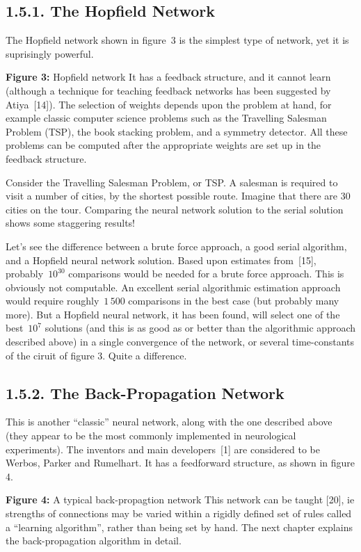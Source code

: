 \documentclass[12pt]{report}
\begin{document}
\subsection{1.5.1. The Hopfield Network}

The Hopfield network shown in figure~3 is the simplest type of network,
yet it is suprisingly powerful.
\par\textbf{Figure 3:} Hopfield network
It has a feedback structure, and it cannot learn (although a technique
for teaching feedback networks has been suggested by Atiya~[14]).
The selection of weights depends upon the problem at hand, for example
classic computer science problems such as the Travelling Salesman
Problem (TSP), the book stacking problem, and a symmetry detector.
All these problems can be computed after the appropriate weights are set
up in the feedback structure.

Consider the Travelling Salesman Problem, or TSP.
A salesman is required to visit a number of cities, by the shortest
possible route.
Imagine that there are 30 cities on the tour.
Comparing the neural network solution to the serial solution shows some staggering
results!

Let's see the difference between a brute force approach, a good serial
algorithm, and a Hopfield neural network solution.
Based upon estimates from~[15],
probably~$10^{30}$ comparisons would be needed for a brute force
approach.
This is obviously not computable.
An excellent serial algorithmic estimation approach would 
require roughly~$1\,500$
comparisons in the best case (but probably many more).
But a Hopfield neural network, it has been found, will select one of the
best~$10^7$ solutions (and this is as good as or better than the algorithmic
approach described above) in a single convergence of the network, or
several time-constants of the ciruit of figure 3.
Quite a difference.

\subsection{1.5.2. The Back-Propagation Network}

This is another ``classic'' neural network, along with the one described above
(they appear to be the most commonly implemented in neurological
experiments).
The inventors and main developers~[1] are considered to be Werbos,
Parker and Rumelhart.
It has a feedforward structure, as shown in figure 4.
\par\textbf{Figure 4:} A typical back-propagtion network
This network can be taught [20], ie strengths of connections may be varied
within a rigidly defined set of rules called a ``learning algorithm'',
rather than being set by hand.
The next chapter explains the back-propagation algorithm in detail.
\end{document}
